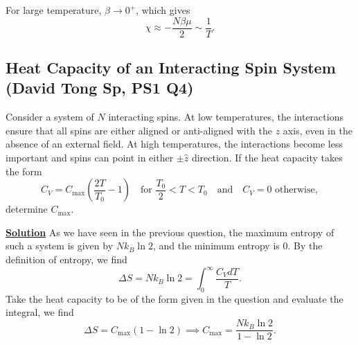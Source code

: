 For large temperature, $\beta\to0^+$, which gives
\begin{equation}
    \chi \approx-\frac{N\beta\mu}{2} \sim \frac{1}{T}.
\end{equation}

\subsection{Heat Capacity of an Interacting Spin System (David Tong Sp, PS1 Q4)}
\label{sec:interacting-spins}

Consider a system of $N$ interacting spins. At low temperatures,
the interactions ensure that all spins are either aligned or anti-aligned with
the $z$ axis, even in the absence of an external field. At high temperatures,
the interactions become less important and spins can point in either
$\pm\hat{z}$ direction. If the heat capacity takes the form
\begin{equation}
  C_V = C_{\max}\!\left(\frac{2T}{T_0}-1\right)
  \quad\text{for } \frac{T_0}{2} < T < T_0
  \quad\text{and}\quad C_V = 0 \text{ otherwise},
\end{equation}
determine $C_{\max}$.

\noindent \underline{\textbf{Solution}} As we have seen in the previous question, the maximum entropy of such a system is given by $Nk_B\ln2$, and the minimum entropy is $0$. By the definition of entropy, we find
\begin{equation}
    \Delta S = Nk_B\ln2 = \int^\infty_0 \frac{C_VdT}{T}.
\end{equation}
Take the heat capacity to be of the form given in the question and evaluate the integral, we find
\begin{equation}
    \Delta S = C_\text{max}(1-\ln2) \implies C_\text{max} = \frac{Nk_B\ln2}{1-\ln2}.
\end{equation}
